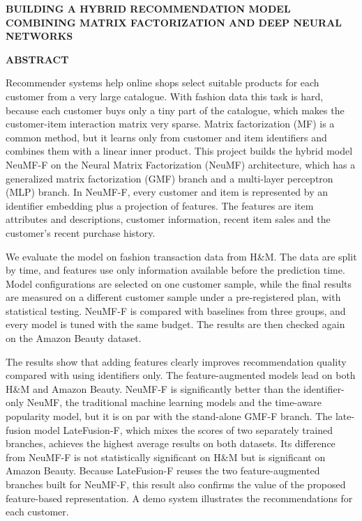 \newpage
\begin{center}
{\fontsize{15pt}{18pt}\selectfont \textbf{BUILDING A HYBRID RECOMMENDATION MODEL COMBINING MATRIX FACTORIZATION AND DEEP NEURAL NETWORKS}\par}
\vspace{0.3cm}
{\fontsize{16pt}{19.2pt}\selectfont \textbf{ABSTRACT}\par}
\end{center}
\vspace{0.1cm}

Recommender systems help online shops select suitable products for each customer from a very large catalogue. With fashion data this task is hard, because each customer buys only a tiny part of the catalogue, which makes the customer-item interaction matrix very sparse. Matrix factorization (MF) is a common method, but it learns only from customer and item identifiers and combines them with a linear inner product. This project builds the hybrid model NeuMF-F on the Neural Matrix Factorization (NeuMF) architecture, which has a generalized matrix factorization (GMF) branch and a multi-layer perceptron (MLP) branch. In NeuMF-F, every customer and item is represented by an identifier embedding plus a projection of features. The features are item attributes and descriptions, customer information, recent item sales and the customer's recent purchase history.

We evaluate the model on fashion transaction data from H\&M. The data are split by time, and features use only information available before the prediction time. Model configurations are selected on one customer sample, while the final results are measured on a different customer sample under a pre-registered plan, with statistical testing. NeuMF-F is compared with baselines from three groups, and every model is tuned with the same budget. The results are then checked again on the Amazon Beauty dataset.

The results show that adding features clearly improves recommendation quality compared with using identifiers only. The feature-augmented models lead on both H\&M and Amazon Beauty. NeuMF-F is significantly better than the identifier-only NeuMF, the traditional machine learning models and the time-aware popularity model, but it is on par with the stand-alone GMF-F branch. The late-fusion model LateFusion-F, which mixes the scores of two separately trained branches, achieves the highest average results on both datasets. Its difference from NeuMF-F is not statistically significant on H\&M but is significant on Amazon Beauty. Because LateFusion-F reuses the two feature-augmented branches built for NeuMF-F, this result also confirms the value of the proposed feature-based representation. A demo system illustrates the recommendations for each customer.
